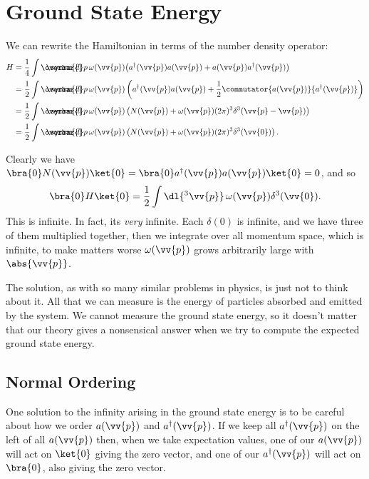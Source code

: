\documentclass[fleqn]{NotesClass}
\newcommand{\hermit}{{\dagger}}
\newcommand\dbar{\ThisStyle{\ensurestackMath{%
            \stackengine{-.3\LMpt}{\SavedStyle \symrm{d}}{\SavedStyle\overbar{}%
                \mkern2.25mu}{O}{r}{F}{F}{L}}}}
\newcommand{\invariantmeasure}[1]{\dbar #1}
\begin{document}
    \section{Ground State Energy}
    We can rewrite the Hamiltonian in terms of the number density operator:
    \begin{align}
        H &= \frac{1}{4} \int \invariantmeasure{p} \, \omega(\vv{p}) \big( a^\hermit(\vv{p}) a(\vv{p}) + a(\vv{p})a^\hermit(\vv{p}) \big)\\
        &= \frac{1}{2} \int \invariantmeasure{p} \, \omega(\vv{p}) \left( a^\hermit(\vv{p})a(\vv{p}) + \frac{1}{2} \commutator{a(\vv{p})}{a^\hermit(\vv{p})} \right)\\
        &= \frac{1}{2} \int \invariantmeasure{p} \, \omega(\vv{p}) \left( N(\vv{p}) + \omega(\vv{p})(2\pi)^3 \delta^3(\vv{p} - \vv{p}) \right)\\
        &= \frac{1}{2} \int \invariantmeasure{p} \, \omega(\vv{p}) \left( N(\vv{p}) + \omega(\vv{p})(2\pi)^3 \delta^3(\vv{0}) \right).
    \end{align}
    
    Clearly we have \(\bra{0}N(\vv{p})\ket{0} = \bra{0} a^\hermit(\vv{p})a(\vv{p})\ket{0} = 0\), and so
    \begin{equation}
        \bra{0}H\ket{0} = \frac{1}{2} \int \dl{^3\vv{p}} \, \omega(\vv{p}) \delta^3(\vv{0}).
    \end{equation}
    This is infinite.
    In fact, its \emph{very} infinite.
    Each \(\delta(0)\) is infinite, and we have three of them multiplied together, then we integrate over all momentum space, which is infinite, to make matters worse \(\omega(\vv{p})\) grows arbitrarily large with \(\abs{\vv{p}}\).
    
    The solution, as with so many similar problems in physics, is just not to think about it.
    All that we can measure is the energy of particles absorbed and emitted by the system.
    We cannot measure the ground state energy, so it doesn't matter that our theory gives a nonsensical answer when we try to compute the expected ground state energy.
    
    \subsection{Normal Ordering}
    One solution to the infinity arising in the ground state energy is to be careful about how we order \(a(\vv{p})\) and \(a^\hermit(\vv{p})\).
    If we keep all \(a^\hermit(\vv{p})\) on the left of all \(a(\vv{p})\) then, when we take expectation values, one of our \(a(\vv{p})\) will act on \(\ket{0}\) giving the zero vector, and one of our \(a^\hermit(\vv{p})\) will act on \(\bra{0}\), also giving the zero vector.
    
\end{document}
